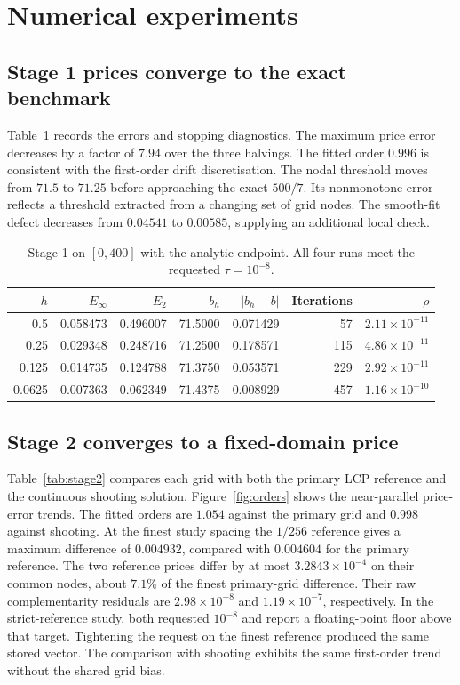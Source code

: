 \documentclass[11pt,a4paper]{article}
\numberwithin{equation}{section}
\begin{document}
\section{Numerical experiments}\label{sec:results}
\subsection{Stage 1 prices converge to the exact benchmark}
Table~\ref{tab:stage1} records the errors and stopping diagnostics.
The maximum price error decreases by a factor of $7.94$ over the
three halvings. The fitted order $0.996$ is consistent with the
first-order drift discretisation. The nodal threshold moves from
$71.5$ to $71.25$ before approaching the exact $500/7$. Its
nonmonotone error reflects a threshold extracted from a changing
set of grid nodes. The smooth-fit defect decreases from $0.04541$ to
$0.00585$, supplying an additional local check.

\begin{table}[htbp]
\centering\small
\caption{Stage 1 on $[0,400]$ with the analytic endpoint.
All four runs meet the requested $\tau=10^{-8}$.}
\label{tab:stage1}
\begin{tabular}{@{}rrrrrrr@{}}
\toprule
$h$ & $E_\infty$ & $E_2$ & $b_h$ & $|b_h-b|$ & Iterations & $\rho$\\
\midrule
0.5    & 0.058473 & 0.496007 & 71.5000 & 0.071429 & 57  & $2.11\times10^{-11}$\\
0.25   & 0.029348 & 0.248716 & 71.2500 & 0.178571 & 115 & $4.86\times10^{-11}$\\
0.125  & 0.014735 & 0.124788 & 71.3750 & 0.053571 & 229 & $2.92\times10^{-11}$\\
0.0625 & 0.007363 & 0.062349 & 71.4375 & 0.008929 & 457 & $1.16\times10^{-10}$\\
\bottomrule
\end{tabular}
\end{table}

\subsection{Stage 2 converges to a fixed-domain price}
Table~\ref{tab:stage2} compares each grid with both the primary LCP
reference and the continuous shooting solution. Figure~\ref{fig:orders}
shows the near-parallel price-error trends. The fitted orders are
$1.054$ against the primary grid and $0.998$ against shooting. At the
finest study spacing the $1/256$ reference gives a maximum difference
of $0.004932$, compared with $0.004604$ for the primary reference.
The two reference prices differ by at most $3.2843\times10^{-4}$ on
their common nodes, about $7.1\%$ of the finest primary-grid difference.
Their raw complementarity residuals are $2.98\times10^{-8}$ and
$1.19\times10^{-7}$, respectively. In the strict-reference study, both requested $10^{-8}$ and report
a floating-point floor above that target. Tightening the request on the finest
reference produced the same stored vector. The comparison with shooting
exhibits the same first-order trend without the shared grid bias.
\end{document}

